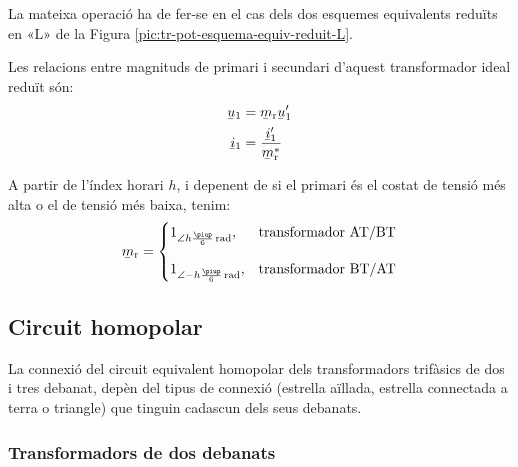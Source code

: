 \break
\begin{center}
    
    \label{fig:esq-reduit-T-complex}
\end{center}

La mateixa operació ha de fer-se en el cas dels dos esquemes equivalents reduïts en «L» de la Figura \vref{pic:tr-pot-esquema-equiv-reduit-L}.

Les relacions entre magnituds de primari i secundari d'aquest transformador ideal reduït són:
\begin{subequations}
\begin{align}
    \cmplx{u}_1 &= \cmplx{m}\ped{r}\cmplx{u}'_1 \label{eq:UmU-reduit}\\
    \cmplx{i}_1 &= \frac{\cmplx{i}'_1}{\cmplx{m}^*\ped{r}} \label{eq:ImI-reduit}
\end{align}
\end{subequations}

A partir de l'índex horari $h$, i depenent de si el primari és el costat de tensió més alta o el de tensió més baixa, tenim:
\begin{equation}
\cmplx{m}\ped{r} = \begin{cases}
      1_{\angle h\frac{\piup}{6}\si{\,rad}}, & \text{transformador AT/BT}\\[2.7ex]
      1_{\angle -h\frac{\piup}{6}\si{\,rad}}, & \text{transformador BT/AT}
\end{cases}
\label{eq:rel-transf-cmplx-reduit}
\end{equation}


\subsection{Circuit homopolar}\label{sec:circuit_homopolar}

La connexió del circuit equivalent homopolar dels transformadors trifàsics de dos i tres debanat, depèn del tipus de connexió (estrella aïllada, estrella connectada a terra o triangle) que tinguin cadascun dels seus debanats.

\subsubsection{Transformadors de dos debanats}\label{sec:cir-hom-2-deb}

